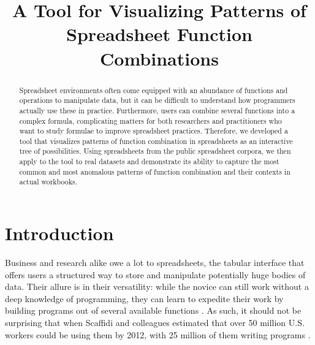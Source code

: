 \documentclass[conference]{IEEEtran}
\begin{document}
 \title{A Tool for Visualizing Patterns of Spreadsheet Function
		Combinations}
	
	
	\author{ }
	
	
	
	
	
	
	\maketitle
	
	\begin{abstract} Spreadsheet environments often come equipped with an abundance
		of functions and operations to manipulate data, but it can be difficult to
		understand how programmers actually use these in practice. Furthermore, users
		can combine several functions into a complex formula, complicating matters for
		both researchers and practitioners who want to study formulae to improve
		spreadsheet practices. Therefore, we developed a tool that visualizes patterns
		of function combination in spreadsheets as an interactive tree of
		possibilities. Using spreadsheets from the public spreadsheet corpora, we then
		apply to the tool to real datasets and demonstrate its ability to capture the
		most common and most anomalous patterns of function combination and their
		contexts in actual workbooks. \end{abstract}
	
	\section{Introduction} Business and research alike owe a lot to spreadsheets, the
	tabular interface that offers users a structured way to store and manipulate
	potentially huge bodies of data. Their allure is in their versatility: while
	the novice can still work without a deep knowledge of programming, they can
	learn to expedite their work by building programs out of several available
	functions \cite{nardi1990spreadsheet}. As such, it should not be surprising
	that when Scaffidi and colleagues estimated that over 50 million U.S. workers
	could be using them by 2012, with 25 million of them writing programs
	\cite{scaffidi2005estimating}. \par
	
\end{document}
